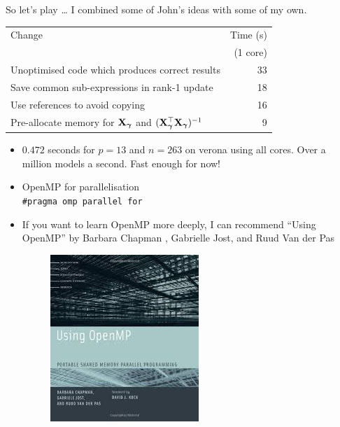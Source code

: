 \documentclass{beamer}
\begin{document}
\begin{frame}{So let's play \ldots}
I combined some of John's ideas with some of my own.
\begin{tabular}{|p{9cm}|r|}
\hline
Change & Time (s) \\
& (1 core) \\
\hline
Unoptimised code which produces correct results & 33 \\
Save common sub-expressions in rank-1 update & 18 \\
Use references to avoid copying & 16 \\
Pre-allocate memory for ${\bf X}_{\boldsymbol \gamma}$ and $({\bf X}_{\boldsymbol \gamma}^\top {\bf X}_{\boldsymbol \gamma})^{-1}$ & 9 \\
\hline
\end{tabular}
\begin{itemize}
\item $0.472$ seconds for $p=13$ and $n=263$ on verona using all cores. Over a million models a second. Fast
			enough for now!
\item OpenMP for parallelisation \\
			\texttt{\#pragma omp parallel for}
\item If you want to learn OpenMP more deeply, I can recommend ``Using OpenMP'' by Barbara Chapman ,
			Gabrielle Jost, and Ruud Van der Pas
\begin{figure}
\includegraphics[scale=0.1]{Using_OpenMP.jpeg}
\end{figure}
\end{itemize}
\end{frame}
\end{document}
